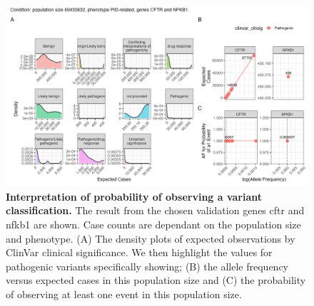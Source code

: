 \begin{figure}[ht]
  \centering
  \includegraphics[width=\textwidth]{../images/validation_studies_scatterdense_expected_prob.png}
  \caption{\textbf{Interpretation of probability of observing a variant classification.} 
 The result from the chosen validation genes \ac{cftr} and \ac{nfkb1} are shown. 
 Case counts are dependant on the population size and phenotype.
(A) The density plots of expected observations by ClinVar clinical significance. 
We then highlight the values for pathogenic variants specifically showing;
(B) the allele frequency versus expected cases in this population size and
(C) the probability of observing at least one event in this population size.}
  \label{fig:validation_scatter_dense}
\end{figure}

